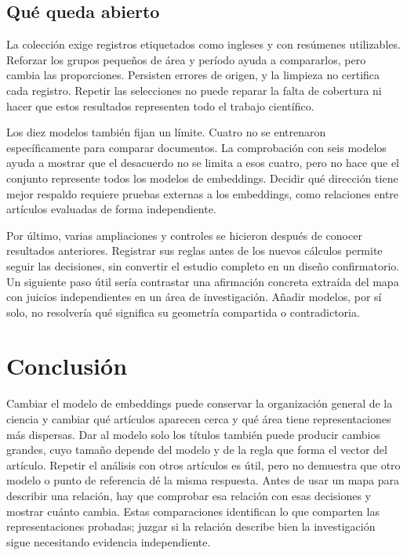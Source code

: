 \documentclass[12pt]{article}
\begin{document}
\subsection{Qué queda abierto}
La colección exige registros etiquetados como ingleses y con resúmenes utilizables. Reforzar los grupos pequeños de área y período ayuda a compararlos, pero cambia las proporciones. Persisten errores de origen, y la limpieza no certifica cada registro. Repetir las selecciones no puede reparar la falta de cobertura ni hacer que estos resultados representen todo el trabajo científico.

Los diez modelos también fijan un límite. Cuatro no se entrenaron específicamente para comparar documentos. La comprobación con seis modelos ayuda a mostrar que el desacuerdo no se limita a esos cuatro, pero no hace que el conjunto represente todos los modelos de embeddings. Decidir qué dirección tiene mejor respaldo requiere pruebas externas a los embeddings, como relaciones entre artículos evaluadas de forma independiente.

Por último, varias ampliaciones y controles se hicieron después de conocer resultados anteriores. Registrar sus reglas antes de los nuevos cálculos permite seguir las decisiones, sin convertir el estudio completo en un diseño confirmatorio. Un siguiente paso útil sería contrastar una afirmación concreta extraída del mapa con juicios independientes en un área de investigación. Añadir modelos, por sí solo, no resolvería qué significa su geometría compartida o contradictoria.

\section{Conclusión}
Cambiar el modelo de embeddings puede conservar la organización general de la ciencia y cambiar qué artículos aparecen cerca y qué área tiene representaciones más dispersas. Dar al modelo solo los títulos también puede producir cambios grandes, cuyo tamaño depende del modelo y de la regla que forma el vector del artículo. Repetir el análisis con otros artículos es útil, pero no demuestra que otro modelo o punto de referencia dé la misma respuesta. Antes de usar un mapa para describir una relación, hay que comprobar esa relación con esas decisiones y mostrar cuánto cambia. Estas comparaciones identifican lo que comparten las representaciones probadas; juzgar si la relación describe bien la investigación sigue necesitando evidencia independiente.
\end{document}
